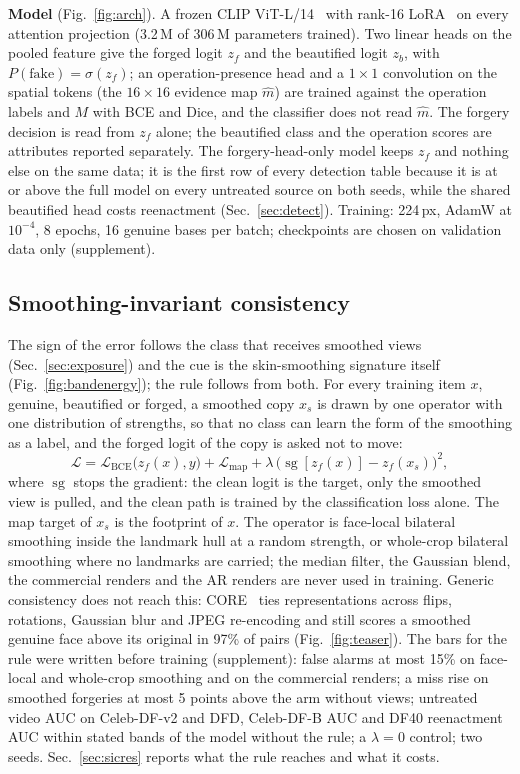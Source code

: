 \documentclass[conference]{IEEEtran}
\begin{document}
\textbf{Model} (Fig.~\ref{fig:arch}). A frozen CLIP ViT-L/14~\cite{clip} with rank-16 LoRA~\cite{lora} on every attention
projection (3.2\,M of 306\,M parameters trained). Two linear heads on the pooled feature give the forged logit $z_f$ and the
beautified logit $z_b$, with $P(\text{fake})=\sigma(z_f)$; an operation-presence head and a $1\times1$ convolution on the
spatial tokens (the $16\times16$ evidence map $\hat m$) are trained against the operation labels and $M$ with BCE and Dice,
and the classifier does not read $\hat m$. The forgery decision is read from $z_f$ alone; the beautified class and the
operation scores are attributes reported separately. The forgery-head-only model keeps $z_f$ and nothing else on the same
data; it is the first row of every detection table because it is at or above the full model on every untreated source on
both seeds, while the shared beautified head costs reenactment (Sec.~\ref{sec:detect}). Training: 224\,px, AdamW at
$10^{-4}$, 8 epochs, 16 genuine bases per batch; checkpoints are chosen on validation data only (supplement).

\subsection{Smoothing-invariant consistency}
\label{sec:sic}
The sign of the error follows the class that receives smoothed views (Sec.~\ref{sec:exposure}) and the cue is the
skin-smoothing signature itself (Fig.~\ref{fig:bandenergy}); the rule follows from both. For every training item $x$,
genuine, beautified or forged, a smoothed copy $x_s$ is drawn by one operator with one distribution of strengths, so that no
class can learn the form of the smoothing as a label, and the forged logit of the copy is asked not to move:
\begin{equation}
\mathcal{L}=\mathcal{L}_\text{BCE}\big(z_f(x),y\big)+\mathcal{L}_\text{map}+\lambda\,\big(\operatorname{sg}[z_f(x)]-z_f(x_s)\big)^2,
\label{eq:sic}
\end{equation}
where $\operatorname{sg}$ stops the gradient: the clean logit is the target, only the smoothed view is pulled, and the clean
path is trained by the classification loss alone. The map target of $x_s$ is the footprint of $x$. The operator is face-local
bilateral smoothing inside the landmark hull at a random strength, or whole-crop bilateral smoothing where no landmarks are
carried; the median filter, the Gaussian blend, the commercial renders and the AR renders are never used in training. Generic
consistency does not reach this: CORE~\cite{core} ties representations across flips, rotations, Gaussian blur and JPEG
re-encoding and still scores a smoothed genuine face above its original in 97\% of pairs (Fig.~\ref{fig:teaser}). The bars for
the rule were written before training (supplement): false alarms at most 15\% on face-local and whole-crop smoothing and on
the commercial renders; a miss rise on smoothed forgeries at most 5 points above the arm without views; untreated video AUC on
Celeb-DF-v2 and DFD, Celeb-DF-B AUC and DF40 reenactment AUC within stated bands of the model without the rule; a $\lambda=0$
control; two seeds. Sec.~\ref{sec:sicres} reports what the rule reaches and what it costs.
\end{document}
